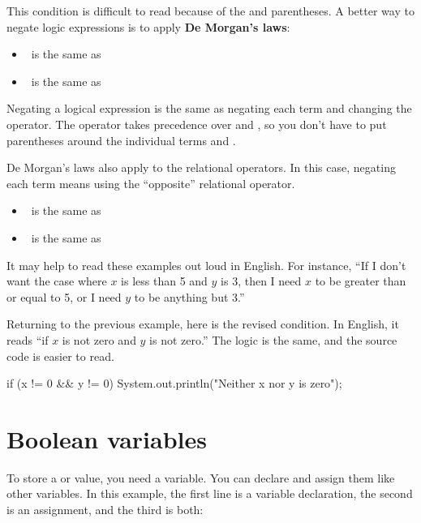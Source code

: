 This condition is difficult to read because of the \java{!} and parentheses.
A better way to negate logic expressions is to apply {\bf De Morgan's laws}:

\begin{itemize}
\item {} ~is the same as~ 
\item {} ~is the same as~ 
\end{itemize}

Negating a logical expression is the same as negating each term and changing the operator.
The \java{!} operator takes precedence over \java{&&} and \java{||}, so you don't have to put parentheses around the individual terms  and .

De Morgan's laws also apply to the relational operators.
In this case, negating each term means using the ``opposite'' relational operator.

\begin{itemize}
\item {} ~is the same as~ 
\item {} ~is the same as~ 
\end{itemize}

It may help to read these examples out loud in English.
For instance, ``If I don't want the case where $x$ is less than 5 and $y$ is 3, then I need $x$ to be greater than or equal to 5, or I need $y$ to be anything but 3.''

Returning to the previous example, here is the revised condition.
In English, it reads ``if $x$ is not zero and $y$ is not zero.''
The logic is the same, and the source code is easier to read.

\begin{code}
if (x != 0 && y != 0) {
    System.out.println("Neither x nor y is zero");
}
\end{code}


\section{Boolean variables}


To store a  or  value, you need a  variable.
You can declare and assign them like other variables.
In this example, the first line is a variable declaration, the second is an assignment, and the third is both:

